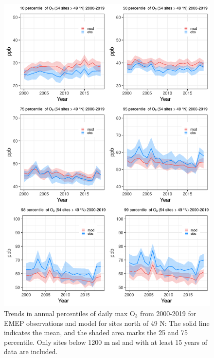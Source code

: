 \begin{figure}
	\centering
	\includegraphics[width=0.74\paperwidth]{FIGS_TRENDS/alltrends_north_49_2000_2019_1200m.png}
	\caption{\label{fig:O3_perctrends_N}Trends in annual percentiles of daily max O$_3$ from 2000-2019 for EMEP observations and model for sites north of 49 N: The solid line indicates the mean, and the shaded area marks the 25 and 75 percentile. Only sites below 1200 m asl and with at least 15 years of data are included.}
\end{figure}

